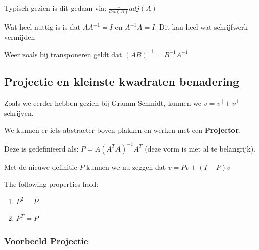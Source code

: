 \documentclass[a4paper]{report}
\begin{document}
Typisch gezien is dit gedaan via: $\frac{1}{det(A)} adj(A)$

Wat heel nuttig is is dat $A A^{-1} = I$ en $A^{-1} A = I$. Dit kan heel wat schrijfwerk vermijden

Weer zoals bij transponeren geldt dat $(AB)^{-1} = B^{-1} A^{-1}$

\subsection{Projectie en kleinste kwadraten benadering}

Zoals we eerder hebben gezien bij Gramm-Schmidt, kunnen we $v= v^{||} + v^{\perp}$ schrijven.

We kunnen er iets abstracter boven plakken en werken met een \textbf{Projector}.

Deze is gedefinieerd als: $P = A (A^T A)^{-1} A^T$ (deze vorm is niet al te belangrijk).

Met de nieuwe definitie $P$ kunnen we nu zeggen dat $v = Pv + (I - P)v$

The following properties hold:

\begin{enumerate}
	\item $P^2 = P$
	\item $P^T = P$
\end{enumerate}

\subsubsection{Voorbeeld Projectie}
\end{document}
